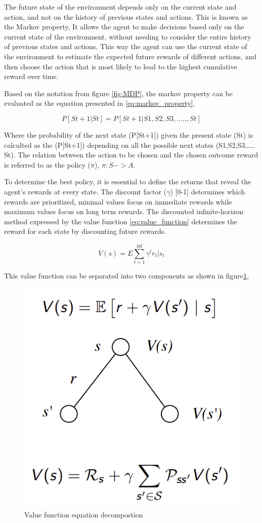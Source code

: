 The future state of the environment depends only on the current state and action, and not on the history of previous states and actions. This is known as the Markov property, It allows the agent to make decisions based only on the current state of the environment, without needing to consider the entire history of previous states and actions. This way the agent can use the current state of the environment to estimate the expected future rewards of different actions, and then choose the action that is most likely to lead to the highest cumulative reward over time.

Based on the notation from figure \ref{fig:MDP}, the markov property can be evaluated as the equation presented in \ref{eq:markov_property}.

\begin{equation}
    \label{eq:markov_property}
    P[St+1|St] = P[St+1|S1,S2,S3,.....,St]
\end{equation}

Where the probability of the next state (P[St+1]) given the present state (St) is calculted as the (P[St+1]) depending on all the possible next states (S1,S2,S3……St).
The relation between the action to be chosen and the chosen outcome reward is referred to as the policy ($\pi$), $\pi: S -> A$.

To determine the best policy, it is essential to define the returns that reveal the agent's rewards at every state. The discount factor ($\gamma$) [0-1] determines which rewards are prioritized, minimal values focus on immediate rewards while maximum values focus on long term rewards. The discounted infinite-horizon method expressed by the value function \ref{eq:value_function} determines the reward for each state by discounting future rewards.

\begin{equation}
    \label{eq:value_function}
    V(s) = E \sum_{t=1}^{\inf}\gamma^t r_t|s_t
\end{equation}

This value function can be separated into two components as shown in figure\ref{fig:bellman}, 

\begin{figure}[!h]
    \centering
    \includegraphics[width=.4\textwidth]{fig/rl/Bellmans decomposition.png}
    \caption{Value function equation decompostion}
    \label{fig:bellman}
\end{figure}

